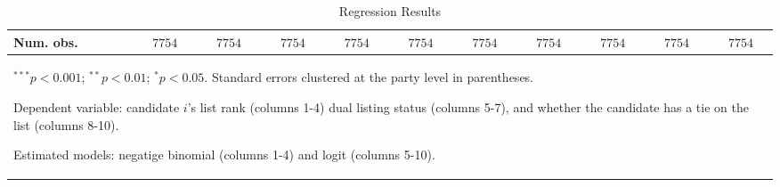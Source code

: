 \begin{table}
\begin{center}
\begin{tabular}{l c c c c c c c c c c}
Num. obs.          & $7754$        & $7754$        & $7754$        & $7754$        & $7754$       & $7754$       & $7754$       & $7754$       & $7754$       & $7754$        \\
\hline
\multicolumn{11}{l}{\scriptsize{\item $^{***}p<0.001$; $^{**}p<0.01$; $^{*}p<0.05$. Standard errors clustered at the party level in parentheses.
\item Dependent variable: candidate $i$'s list rank (columns 1-4) dual listing status (columns 5-7), and whether the candidate has a tie on the list (columns 8-10).
\item Estimated models: negatige binomial (columns 1-4) and logit (columns 5-10).}}
\end{tabular}
\caption{Regression Results}
\label{tab:regression_results}
\end{center}
\end{table}
